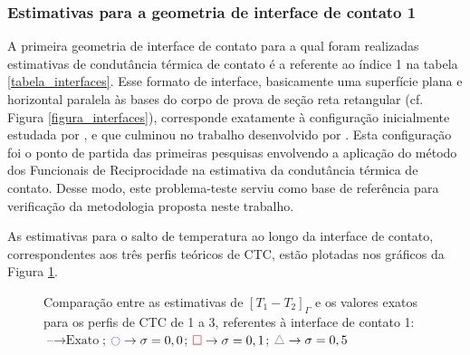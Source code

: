\subsubsection{Estimativas para a geometria de interface de contato 1}

A primeira geometria de interface de contato para a qual foram realizadas estimativas de condutância térmica de contato é a referente ao índice 1 na tabela \ref{tabela_interfaces}. Esse formato de interface, basicamente uma superfície plana e horizontal paralela às bases do corpo de prova de seção reta retangular (cf. Figura \ref{figura_interfaces}), corresponde exatamente à configuração inicialmente estudada por \cite{reciproc_3}, e que culminou no trabalho desenvolvido por \cite{tese_padilha}. Esta configuração foi o ponto de partida das primeiras pesquisas envolvendo a aplicação do método dos Funcionais de Reciprocidade na estimativa da condutância térmica de contato. Desse modo, este problema-teste serviu como base de referência para verificação da metodologia proposta neste trabalho.

As estimativas para o salto de temperatura ao longo da interface de contato, correspondentes aos três perfis teóricos de CTC, estão plotadas nos gráficos da Figura \ref{figura_delta_temperaturas_interface_01}. 
\begin{figure}[H]
	\caption{Comparação entre as estimativas de $[T_1 - T_2]_\Gamma$ e os valores exatos para os perfis de CTC de 1 a 3, referentes à interface de contato 1: $\text{--} \rightarrow \text{Exato}$; $\textcolor{blue}{\ocircle} \rightarrow \sigma = 0,0$; $\textcolor{red}{\square} \rightarrow \sigma = 0,1$; $\textcolor{gray}{\triangle} \rightarrow \sigma = 0,5$}
	\label{figura_delta_temperaturas_interface_01}
\end{figure}

